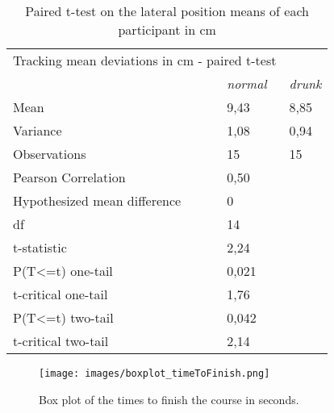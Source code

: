 \begin{table}[]
\centering
\begin{tabular}{lll}
\multicolumn{2}{l}{Tracking mean deviations in cm - paired t-test}                       &                \\
\multicolumn{1}{c|}{\textit{}}                    & \multicolumn{1}{l|}{\textit{normal}} & \textit{drunk} \\ \hline
\multicolumn{1}{l|}{Mean}                         & \multicolumn{1}{l|}{9,43}            & 8,85           \\
\multicolumn{1}{l|}{Variance}                     & \multicolumn{1}{l|}{1,08}            & 0,94           \\
\multicolumn{1}{l|}{Observations}                 & \multicolumn{1}{l|}{15}              & 15             \\
\multicolumn{1}{l|}{Pearson Correlation}          & \multicolumn{1}{l|}{0,50}            &                \\
\multicolumn{1}{l|}{Hypothesized mean difference} & \multicolumn{1}{l|}{0}               &                \\
\multicolumn{1}{l|}{df}                           & \multicolumn{1}{l|}{14}              &                \\
\multicolumn{1}{l|}{t-statistic}                  & \multicolumn{1}{l|}{2,24}            &                \\
\multicolumn{1}{l|}{P(T\textless{}=t) one-tail}   & \multicolumn{1}{l|}{0,021}            &                \\
\multicolumn{1}{l|}{t-critical one-tail}          & \multicolumn{1}{l|}{1,76}            &                \\
\multicolumn{1}{l|}{P(T\textless{}=t) two-tail}   & \multicolumn{1}{l|}{0,042}            &                \\
\multicolumn{1}{l|}{t-critical two-tail}          & \multicolumn{1}{l|}{2,14}            &               
\end{tabular}
\caption{Paired t-test on the lateral position means of each participant in cm}
\label{table:tracking t-test}
\end{table}

\begin{figure}[h]
    \centering
	\texttt{[image: images/boxplot\_timeToFinish.png]}
	\caption[
		Box plot time to finish
	]{
		Box plot of the times to finish the course in seconds.
	}
	\label{figure:boxplotTimeToFinish}
\end{figure}


